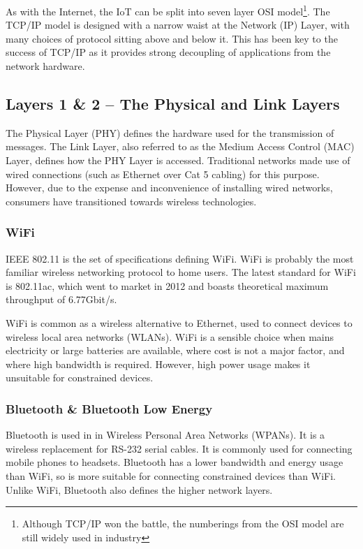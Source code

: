 \documentclass[10pt,journal,compsoc]{IEEEtran}
\begin{document}
As with the Internet, the IoT can be split into seven layer OSI
model\footnote{Although TCP/IP won the battle, the numberings from the OSI
model are still widely used in industry}. The TCP/IP model is designed with a
narrow waist at the Network (IP) Layer, with many choices of protocol sitting
above and below it. This has been key to the success of TCP/IP as it
provides strong decoupling of applications from the network hardware.

\subsection{Layers 1 \& 2 -- The Physical and Link Layers}
\label{layer_1_2}
The Physical Layer (PHY) defines the hardware used for the transmission of
messages. The Link Layer, also referred to as the Medium Access Control (MAC)
Layer, defines how the PHY Layer is accessed. Traditional networks made use of
wired connections (such as Ethernet over Cat 5 cabling) for this purpose.
However, due to the expense and inconvenience of installing wired networks,
consumers have transitioned towards wireless technologies. 

\subsubsection{WiFi}
IEEE 802.11 is the set of specifications defining WiFi. WiFi is probably the
most familiar wireless networking protocol to home users. The latest standard
for WiFi is 802.11ac, which went to market in 2012 and boasts theoretical
maximum throughput of 6.77Gbit/s. 

WiFi is common as a wireless alternative to Ethernet, used to connect devices
to wireless local area networks (WLANs). WiFi is a sensible choice when mains
electricity or large batteries are available, where cost is not a major
factor, and where high bandwidth is required. However, high power usage makes
it unsuitable for constrained devices.

\subsubsection{Bluetooth \& Bluetooth Low Energy}
Bluetooth is used in in Wireless Personal Area Networks (WPANs). It is a
wireless replacement for RS-232 serial cables. It is commonly used for
connecting mobile phones to headsets. Bluetooth has a lower bandwidth and
energy usage than WiFi, so is more suitable for connecting constrained devices
than WiFi. Unlike WiFi, Bluetooth also defines the higher network layers. 
\end{document}
